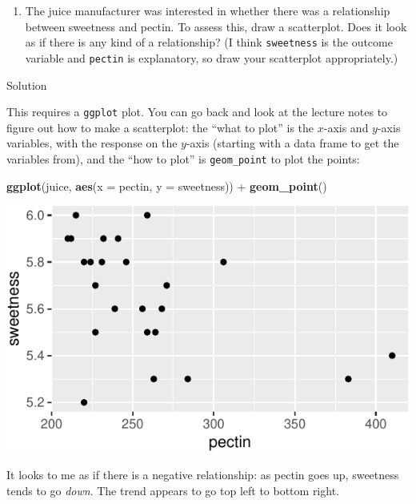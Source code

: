 \documentclass[]{tufte-book}
\newenvironment{Shaded}{}{}
\newcommand{\DataTypeTok}[1]{\textcolor[rgb]{0.56,0.13,0.00}{#1}}
\newcommand{\KeywordTok}[1]{\textcolor[rgb]{0.00,0.44,0.13}{\textbf{#1}}}
\newcommand{\NormalTok}[1]{#1}
\newcommand{\OperatorTok}[1]{\textcolor[rgb]{0.40,0.40,0.40}{#1}}
\newcommand{\StringTok}[1]{\textcolor[rgb]{0.25,0.44,0.63}{#1}}
\providecommand{\tightlist}{%
  \setlength{\itemsep}{0pt}\setlength{\parskip}{0pt}}
\theoremstyle{definition}
\theoremstyle{definition}
\theoremstyle{definition}
\theoremstyle{remark}
\begin{document}
\begin{enumerate}
\def\labelenumi{(\alph{enumi})}
\setcounter{enumi}{3}
\tightlist
\item
  The juice manufacturer was interested in whether there was a
  relationship between sweetness and pectin. To assess this, draw a
  scatterplot. Does it look as if there is any kind of a relationship?
  (I think \texttt{sweetness} is the outcome variable and
  \texttt{pectin} is explanatory, so draw your scatterplot
  appropriately.)
\end{enumerate}

Solution

This requires a \texttt{ggplot} plot. You can go back and look at the
lecture notes to figure out how to make a scatterplot: the ``what to
plot'' is the \(x\)-axis and \(y\)-axis variables, with the response on
the \(y\)-axis (starting with a data frame to get the variables from),
and the ``how to plot'' is \texttt{geom\_point} to plot the points:

\begin{Shaded}
\begin{Highlighting}[]
\KeywordTok{ggplot}\NormalTok{(juice, }\KeywordTok{aes}\NormalTok{(}\DataTypeTok{x =}\NormalTok{ pectin, }\DataTypeTok{y =}\NormalTok{ sweetness)) }\OperatorTok{+}\StringTok{ }
\StringTok{    }\KeywordTok{geom_point}\NormalTok{()}
\end{Highlighting}
\end{Shaded}

\includegraphics{02-reading-in_files/figure-latex/unnamed-chunk-8-1}

It looks to me as if there is a negative relationship: as pectin goes
up, sweetness tends to go \emph{down}. The trend appears to go top left
to bottom right.
\end{document}
